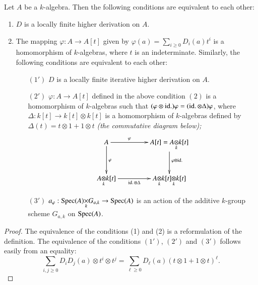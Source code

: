 \subsection{}\label{chap1:1.2}
\begin{lemma*}
  Let $A$ be a $k$-algebra. Then the following conditions are equivalent
  to each other:
  \begin{enumerate}
    \renewcommand{\labelenumi}{\rm(\theenumi)}
  \item $D$ is a locally finite higher derivation on $A$.
    
  \item The mapping $\varphi:A\to A[t]$ given by
    $\varphi(a)=\sum\limits_{i\geq 0}D_{i}(a)t^{i}$ 
    is a homomorphism
    of $k$-algebras, where $t$ is an indeterminate. Similarly, the
    following conditions are equivalent to each other:
    \begin{itemize}
    \item[$(1')$] $D$ is a locally finite iterative higher derivation on
      $A$.
      
    \item[$(2')$] $\varphi:A\to A[t]$ defined in the above condition $(2)$
      is a homomorphism of $k$-algebras such that $(\varphi\otimes
      \operatorname{id.})\varphi=(\operatorname{id.}\otimes \Delta)\varphi$, where\pageoriginale\
      $\Delta:k[t]\to k[t]\otimes k[t]$ is a homomorphism of $k$-algebras
      defined by $\Delta(t)=t\otimes 1+1\otimes t$ {\em (\cf the
        commutative diagram below);}
      \[
      \xymatrix@C=1.5cm@R=1.1cm{
        A\ar[d]^{\varphi}\ar[r]^-{\varphi} &
        A[t]=\foprod{A}{k[t]}{k}\ar[d]^{\varphi\otimes\idd}\\
        \foprod{A}{k[t]}{k}\ar[r]_-{\idd\otimes \Delta} & \foprod{\foprod{A}{k[t]}{k}}{k[t]}{k}
      }
      \]
      
    \item[$(3')$] $a_{\varphi}:\fprod{\Spec(A)}{G_{a,k}}{k}\to \Spec(A)$
      is an action of the additive $k$-group scheme $G_{a,k}$ on $\operatorname{Spec}(A)$.
    \end{itemize}
  \end{enumerate}
\end{lemma*}

\begin{proof}
The equivalence of the conditions (1) and (2) is a reformulation of
the definition. The equivalence of the conditions $(1')$, $(2')$ and
$(3')$ follows easily from an equality:
$$
\sum_{i,j\geq 0}D_{i}D_{j}(a)\otimes t^{i}\otimes
t^{j}=\sum_{\ell\geq 0}D_{\ell}(a)(t\otimes 1+1\otimes t)^{\ell}.
$$
\end{proof}

